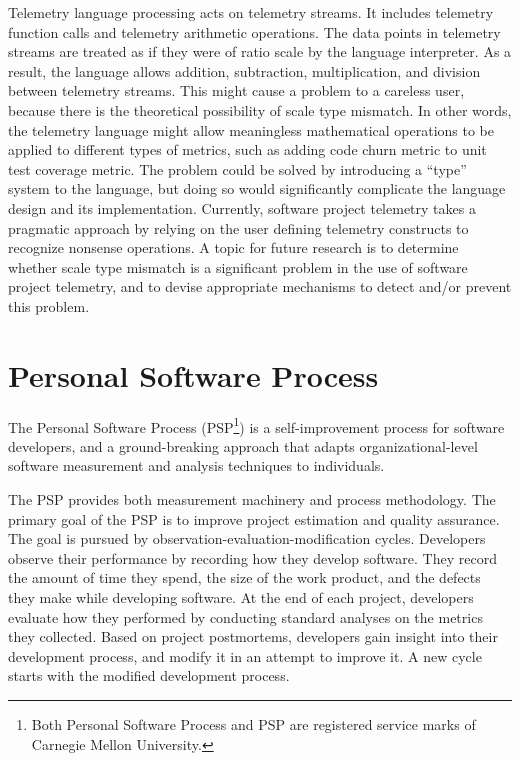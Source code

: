 Telemetry language processing acts on telemetry streams. It includes telemetry function calls and telemetry arithmetic operations. The data points in telemetry streams are treated as if they were of ratio scale by the language interpreter. As a result, the language allows addition, subtraction, multiplication, and division between telemetry streams. This might cause a problem to a careless user, because there is the theoretical possibility of scale type mismatch. In other words, the telemetry language might allow meaningless mathematical operations to be applied to different types of metrics, such as adding code churn metric to unit test coverage metric. The problem could be solved by introducing a ``type'' system to the language, but doing so would significantly complicate the language design and its implementation. Currently, software project telemetry takes a pragmatic approach by relying on the user defining telemetry constructs to recognize nonsense operations. A topic for future research is to determine whether scale type mismatch is a significant problem in the use of software project telemetry, and to devise appropriate mechanisms to detect and/or prevent this problem.









\section{Personal Software Process}  \label{RelatedWork:PSP}

The Personal Software Process (PSP\footnote{Both Personal Software Process and PSP are registered service marks of Carnegie Mellon University.}) \cite{Humphrey:1995, Humphrey:1996} is a self-improvement process for software developers, and a ground-breaking approach that adapts organizational-level software measurement and analysis techniques to individuals. 

The PSP provides both measurement machinery and process methodology. The primary goal of the PSP is to improve project estimation and quality assurance. The goal is pursued by observation-evaluation-modification cycles. Developers observe their performance by recording how they develop software. They record the amount of time they spend, the size of the work product, and the defects they make while developing software. At the end of each project, developers evaluate how they performed by conducting standard analyses on the metrics they collected. Based on project postmortems, developers gain insight into their development process, and modify it in an attempt to improve it. A new cycle starts with the modified development process.

